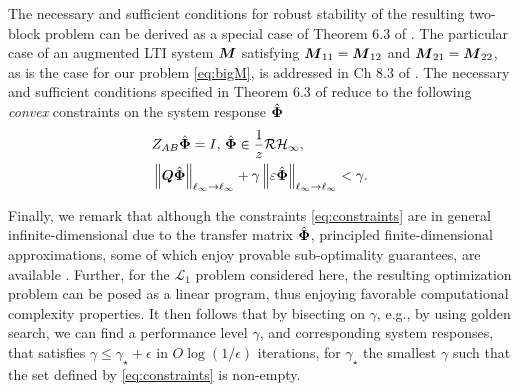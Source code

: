 The necessary and sufficient conditions for robust stability of the resulting two-block problem can be derived as a special case of Theorem 6.3 of \cite{khammash1990stability}.  The particular case of an  augmented LTI system $\boldsymbol{M}$ satisfying $\boldsymbol{M}_{11} = \boldsymbol{M}_{12}$ and $\boldsymbol{M}_{21} = \boldsymbol{M}_{22}$, as is the case for our problem \eqref{eq:bigM}, is addressed in Ch 8.3 of \cite{khammash1990stability}.  The necessary and sufficient conditions specified in Theorem 6.3 of \cite{khammash1990stability} reduce to the following \emph{convex} constraints on the system response $\hat{\boldsymbol{\Phi}}$
\begin{equation} \label{eq:constraints}
\begin{aligned}
&Z_{AB}\hat{\boldsymbol{\Phi}} = I, \, \hat{\boldsymbol{\Phi}} \in \frac{1}{z}\mathcal{RH}_\infty, \\
& \left\|\boldsymbol{Q}\hat{\boldsymbol{\Phi}}\right\|_{\ell_\infty\to\ell_\infty} + \gamma\left\|\varepsilon\hat{\boldsymbol{\Phi}}\right\|_{\ell_\infty\to\ell_\infty} < \gamma.
\end{aligned}
\end{equation}

Finally, we remark that although the constraints \eqref{eq:constraints} are in general infinite-dimensional due to the transfer matrix $\hat{\boldsymbol{\Phi}}$, principled finite-dimensional approximations, some of which enjoy provable sub-optimality guarantees, are available \cite{matni2017scalable,anderson2019system,dean2017sample,dean2018regret}.  Further, for the $\mathcal{L}_1$ problem considered here, the resulting optimization problem can be posed as a linear program, thus enjoying favorable computational complexity properties.
It then follows that by bisecting on $\gamma$, e.g., by using golden search, we can find a performance level $\gamma$, and corresponding system responses, that satisfies $\gamma \leq \gamma_\star + \epsilon$ in $O\log(1/\epsilon)$ iterations, for $\gamma_\star$ the smallest $\gamma$ such that the set defined by \eqref{eq:constraints} is non-empty.

